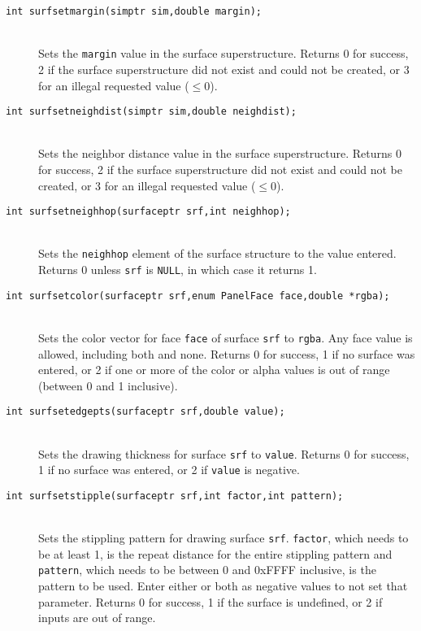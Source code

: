 \documentclass {book}
\begin{document}
\begin{description}
\item[\texttt{int surfsetmargin(simptr sim,double margin);}]
\hfill \\
Sets the \texttt{margin} value in the surface superstructure. Returns 0 for success, 2 if the surface superstructure did not exist and could not be created, or 3 for an illegal requested value ($\leq 0$).

\item[\texttt{int surfsetneighdist(simptr sim,double neighdist);}]
\hfill \\
Sets the neighbor distance value in the surface superstructure. Returns 0 for success, 2 if the surface superstructure did not exist and could not be created, or 3 for an illegal requested value ($\leq 0$).

\item[\texttt{int surfsetneighhop(surfaceptr srf,int neighhop);}]
\hfill \\
Sets the \texttt{neighhop} element of the surface structure to the value entered. Returns 0 unless \texttt{srf} is \texttt{NULL}, in which case it returns 1.

\item[\texttt{int surfsetcolor(surfaceptr srf,enum PanelFace face,double *rgba);}]
\hfill \\
Sets the color vector for face \texttt{face} of surface \texttt{srf} to \texttt{rgba}. Any face value is allowed, including both and none. Returns 0 for success, 1 if no surface was entered, or 2 if one or more of the color or alpha values is out of range (between 0 and 1 inclusive).

\item[\texttt{int surfsetedgepts(surfaceptr srf,double value);}]
\hfill \\
Sets the drawing thickness for surface \texttt{srf} to \texttt{value}. Returns 0 for success, 1 if no surface was entered, or 2 if \texttt{value} is negative.

\item[\texttt{int surfsetstipple(surfaceptr srf,int factor,int pattern);}]
\hfill \\
Sets the stippling pattern for drawing surface \texttt{srf}. \texttt{factor}, which needs to be at least 1, is the repeat distance for the entire stippling pattern and \texttt{pattern}, which needs to be between 0 and 0xFFFF inclusive, is the pattern to be used. Enter either or both as negative values to not set that parameter. Returns 0 for success, 1 if the surface is undefined, or 2 if inputs are out of range.


\end{description}
\end{document}
